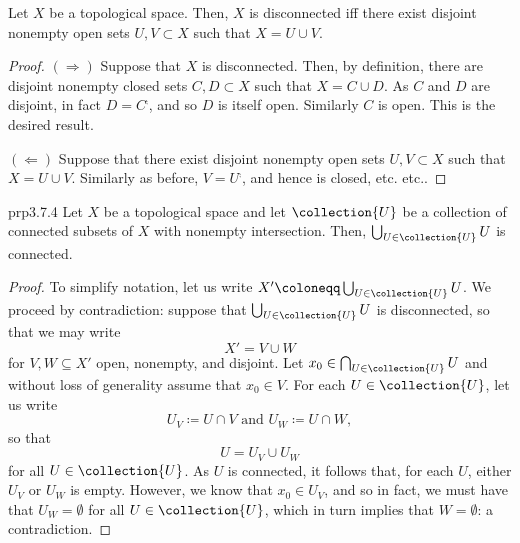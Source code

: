 \begin{prp}{}{}
Let $X$ be a topological space.  Then, $X$ is disconnected iff there exist disjoint nonempty open sets $U,V\subset X$ such that $X=U\cup V$.
\begin{proof}
$(\Rightarrow )$ Suppose that $X$ is disconnected.  Then, by definition, there are disjoint nonempty closed sets $C,D\subset X$ such that $X=C\cup D$.  As $C$ and $D$ are disjoint, in fact $D=C^{\comp}$, and so $D$ is itself open.  Similarly $C$ is open.  This is the desired result.

\blankline
\noindent
$(\Leftarrow )$ Suppose that there exist disjoint nonempty open sets $U,V\subset X$ such that $X=U\cup V$.  Similarly as before, $V=U^{\comp}$, and hence is closed, etc. etc..
\end{proof}
\end{prp}
\begin{prp}{}{prp3.7.4}
Let $X$ be a topological space and let $\collection{U}$ be a collection of connected subsets of $X$ with nonempty intersection.  Then, $\bigcup _{U\in \collection{U}}U$ is connected.
\begin{proof}
To simplify notation, let us write $X'\coloneqq \bigcup _{U\in \collection{U}}U$.  We proceed by contradiction:  suppose that $\bigcup _{U\in \collection{U}}U$ is disconnected, so that we may write
\begin{equation}
X'=V\cup W
\end{equation}
for $V,W\subseteq X'$ open, nonempty, and disjoint.  Let $x_0\in \bigcap _{U\in \collection{U}}U$ and without loss of generality assume that $x_0\in V$.  For each $U\in \collection{U}$, let us write
\begin{equation}
U_V\coloneqq U\cap V\text{ and }U_W\coloneqq U\cap W,
\end{equation}
so that
\begin{equation}
U=U_V\cup U_W
\end{equation}
for all $U\in \collection{U}$.  As $U$ is connected, it follows that, for each $U$, either $U_V$ or $U_W$ is empty.  However, we know that $x_0\in U_V$, and so in fact, we must have that $U_W=\emptyset$ for all $U\in \collection{U}$, which in turn implies that $W=\emptyset$:  a contradiction.
\end{proof}
\end{prp}
